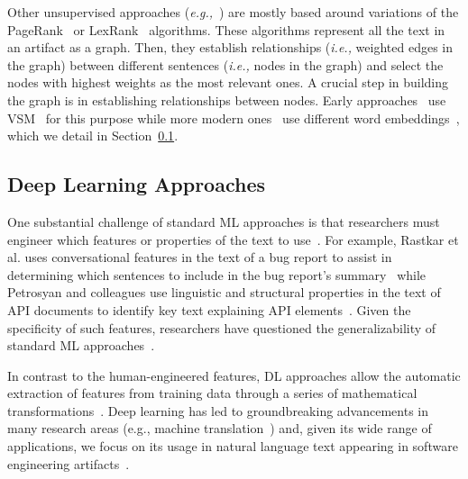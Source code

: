 Other unsupervised approaches 
(\textit{e.g.,}~\cite{Jiang2017, Ponzanelli2015,  Ponzanelli2017})
are mostly based around variations of the PageRank~\cite{Page1999} or LexRank~\cite{Erkan2004} algorithms. 
These algorithms represent all the text in an artifact as a graph.
Then, they establish relationships (\textit{i.e.,} weighted edges in the graph) 
between different sentences (\textit{i.e.,} nodes in the graph) 
and select the nodes with highest weights as the most relevant ones.
A crucial step in building the graph is in  
establishing  relationships between nodes.
Early approaches~\cite{Lotufo2012, Jiang2017} 
use \ac{VSM}~\cite{Salton1975vsm} 
for this purpose while more modern ones~\cite{Huang2018, silva2019}
use different word embeddings~\cite{Mikolov2013, bojanowski2017FastText},
which we detail in Section~\ref{cp2:deep-learning}.








\subsection{Deep Learning Approaches}
\label{cp2:deep-learning}



One substantial challenge of standard \acf{ML}
approaches is that researchers must engineer which 
features or properties of the text to use~\cite{ferreira2021}.
For example, Rastkar et al. uses conversational features in 
the text of a bug report to assist in determining which sentences 
to include in the bug report's summary~\cite{Rastkar2010}
while Petrosyan and colleagues use 
linguistic and structural properties 
in the text of API documents to identify key text 
explaining API elements~\cite{Petrosyan2015}.
Given the specificity of such features, 
researchers have questioned the generalizability
of standard \acs{ML} approaches~\cite{Xiao2018, fucci2019}.



In contrast to the human-engineered features,
\acf{DL} approaches allow the automatic extraction of features 
from training data through a series of mathematical transformations~\cite{Deng2018, zhang2021deep}.
Deep learning has led to groundbreaking advancements in many 
research areas (e.g., machine translation~\cite{lopez2008translation}) 
and, given its wide range of applications, 
we focus
on its usage in natural language text appearing in software engineering artifacts~\cite{ferreira2021, li2018deep, watson2022}.









